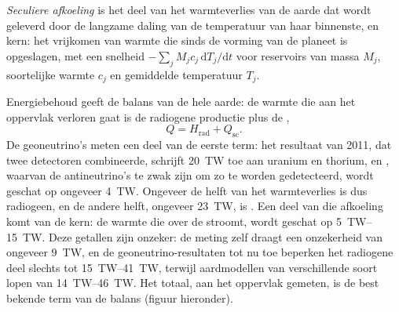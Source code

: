 \begin{definition}\label{def:b1:heat-budget:secular-cooling}
\emph{Seculiere afkoeling} is het deel van het warmteverlies van de aarde dat wordt geleverd door de langzame daling van de temperatuur van haar binnenste,  en kern: het vrijkomen van warmte die sinds de vorming van de planeet is opgeslagen, met een snelheid $-\sum_j M_j c_j\,\mathrm dT_j/\mathrm dt$ voor reservoirs van massa $M_j$, soortelijke warmte $c_j$ en gemiddelde temperatuur $T_j$.
\end{definition}

Energiebehoud geeft de balans van de hele aarde: de warmte die aan het oppervlak verloren gaat is de radiogene productie plus de ,
\[
  Q = H_{\text{rad}} + Q_{\text{sc}} .
\]
De geoneutrino's meten een deel van de eerste term: het resultaat van 2011, dat twee detectoren combineerde, schrijft \qty{20}{TW} toe aan uranium en thorium, en , waarvan de antineutrino's te zwak zijn om zo te worden gedetecteerd, wordt geschat op ongeveer \qty{4}{TW}.
Ongeveer de helft van het warmteverlies is dus radiogeen, en de andere helft, ongeveer \qty{23}{TW}, is . Een deel van die afkoeling komt van de kern: de warmte die over de  stroomt, wordt geschat op \qtyrange{5}{15}{TW}. Deze getallen zijn onzeker: de meting zelf draagt een onzekerheid van ongeveer \qty{9}{TW}, en de geoneutrino-resultaten tot nu toe beperken het radiogene deel slechts tot \qtyrange{15}{41}{TW}, terwijl aardmodellen van verschillende soort lopen van \qtyrange{14}{46}{TW}. Het totaal, aan het oppervlak gemeten, is de best bekende term van de balans (figuur hieronder).

